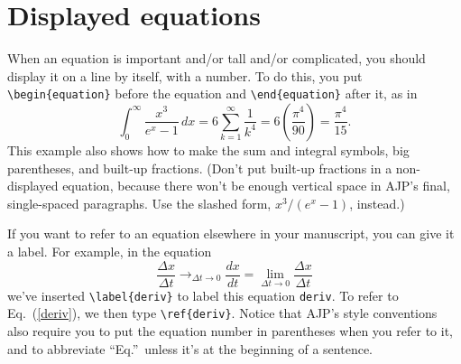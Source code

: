\documentclass[prb,preprint]{revtex4-1}
\begin{document}
\section{Displayed equations}
\label{DispEqSection}	%

When an equation is important and/or tall and/or complicated, you should 
display it on a line by itself, with a number. To do this, you put 
\verb/\begin{equation}/ before the equation and \verb/\end{equation}/ 
after it, as in     %
\begin{equation}
\int_0^\infty \! \frac{x^3}{e^x - 1} \, dx = 6\sum_{k=1}^\infty \frac1{k^4} = 
    6\left(\frac{\pi^4}{90}\right) = \frac{\pi^4}{15}.
\end{equation}
This example also shows how to make the sum and integral symbols, big parentheses, 
and built-up fractions.  (Don't put built-up fractions in a 
non-displayed equation, because there won't be enough vertical space in 
AJP's final, single-spaced paragraphs.  Use the slashed form, $x^3/(e^x-1)$, 
instead.)

If you want to refer to an equation elsewhere in your manuscript, you can 
give it a label.  For example, in the equation
\begin{equation}
\label{deriv}
\frac{\Delta x}{\Delta t} \mathop{\longrightarrow}_{\Delta t\rightarrow0} \frac{dx}{dt} 
 = \lim_{\Delta t\rightarrow0} \frac{\Delta x}{\Delta t}
\end{equation}
we've inserted \verb/\label{deriv}/ to label this equation 
\texttt{deriv}.\cite{labelnames}  To refer to 
Eq.~(\ref{deriv}), we then type \verb/\ref{deriv}/.\cite{footnotes}  Notice 
that AJP's style conventions also require you to put the equation number in 
parentheses when you refer to it, and to abbreviate ``Eq.''\ unless it's at 
the beginning of a sentence.
\end{document}
